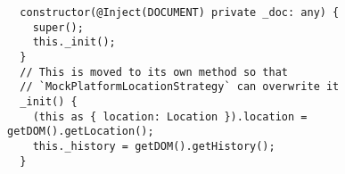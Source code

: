 \begin{verbatim}
  constructor(@Inject(DOCUMENT) private _doc: any) {
    super();
    this._init();
  }
  // This is moved to its own method so that
  // `MockPlatformLocationStrategy` can overwrite it
  _init() {
    (this as { location: Location }).location = getDOM().getLocation();
    this._history = getDOM().getHistory();
  }
\end{verbatim}
